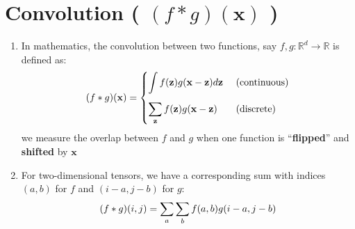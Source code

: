 \section{Convolution ( $(f * g)(\mathbf{x})$ ) \cite{dnn-1}} \label{function: Convolution}

\begin{enumerate}
    \item In mathematics, the convolution between two functions, say $f, g: \mathbb{R}^d \to \mathbb{R}$ is defined as:
    \[
        \hfill
        (f * g)(\mathbf{x}) = 
        \begin{dcases}
            \dint f(\mathbf{z}) g(\mathbf{x}-\mathbf{z}) d\mathbf{z} & \text{ (continuous)} \\[1ex]
            \dsum_\mathbf{z} f(\mathbf{z}) g(\mathbf{x}-\mathbf{z}) & \text{ (discrete)} \\
        \end{dcases}
        \hfill
    \]
    we measure the overlap between $f$ and $g$ when one function is “\textbf{flipped}” and \textbf{shifted} by $\mathbf{x}$

    \item For two-dimensional tensors, we have a corresponding sum with indices $(a, b)$ for $f$ and $(i - a, j - b)$ for $g$:
    \[
        \hfill
        (f * g)(i, j) = \dsum_a\dsum_b f(a, b) g(i-a, j-b)
        \hfill
    \]
\end{enumerate}













































